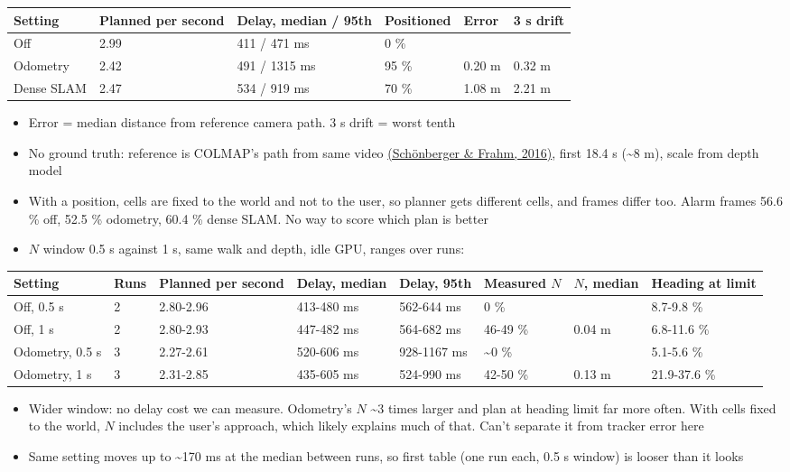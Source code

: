 \documentclass[a4paper]{article}
\begin{document}
\begin{table}[H]
\centering
\begin{tabular}{|l|l|l|l|l|l|}
	\hline
	\textbf{Setting} & \textbf{Planned per second} & \textbf{Delay, median / 95th} & \textbf{Positioned} & \textbf{Error} & \textbf{3 s drift} \\
	\hline
	Off & 2.99 & 411 / 471 ms & 0 \% &  &  \\
	Odometry & 2.42 & 491 / 1315 ms & 95 \% & 0.20 m & 0.32 m \\
	Dense SLAM & 2.47 & 534 / 919 ms & 70 \% & 1.08 m & 2.21 m \\
	\hline
\end{tabular}
\end{table}

\begin{itemize}
	\item Error = median distance from reference camera path. 3 s drift = worst tenth
	\item No ground truth: reference is COLMAP's path from same video \hyperref[references]{(Schönberger \& Frahm, 2016)}, first 18.4 s (\textasciitilde 8 m), scale from depth model
	\item With a position, cells are fixed to the world and not to the user, so planner gets different cells, and frames differ too. Alarm frames 56.6 \% off, 52.5 \% odometry, 60.4 \% dense SLAM. No way to score which plan is better
	\item $N$ window 0.5 s against 1 s, same walk and depth, idle GPU, ranges over runs:
\end{itemize}

\begin{table}[H]
\centering
\begin{tabular}{|l|l|l|l|l|l|l|l|}
	\hline
	\textbf{Setting} & \textbf{Runs} & \textbf{Planned per second} & \textbf{Delay, median} & \textbf{Delay, 95th} & \textbf{Measured $N$} & \textbf{$N$, median} & \textbf{Heading at limit} \\
	\hline
	Off, 0.5 s & 2 & 2.80-2.96 & 413-480 ms & 562-644 ms & 0 \% &  & 8.7-9.8 \% \\
	Off, 1 s & 2 & 2.80-2.93 & 447-482 ms & 564-682 ms & 46-49 \% & 0.04 m & 6.8-11.6 \% \\
	Odometry, 0.5 s & 3 & 2.27-2.61 & 520-606 ms & 928-1167 ms & \textasciitilde 0 \% &  & 5.1-5.6 \% \\
	Odometry, 1 s & 3 & 2.31-2.85 & 435-605 ms & 524-990 ms & 42-50 \% & 0.13 m & 21.9-37.6 \% \\
	\hline
\end{tabular}
\end{table}

\begin{itemize}
	\item Wider window: no delay cost we can measure. Odometry's $N$ \textasciitilde 3 times larger and plan at heading limit far more often. With cells fixed to the world, $N$ includes the user's approach, which likely explains much of that. Can't separate it from tracker error here
	\item Same setting moves up to \textasciitilde 170 ms at the median between runs, so first table (one run each, 0.5 s window) is looser than it looks
\end{itemize}
\end{document}
